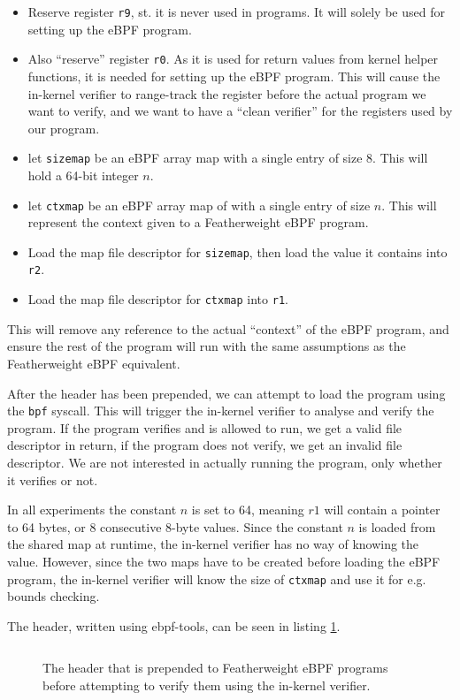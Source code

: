 \begin{itemize}
\item Reserve register \texttt{r9}, st. it is never used in programs. It will solely be used for setting up the eBPF program.
  \item Also ``reserve'' register \texttt{r0}. As it is used for return values from kernel helper functions, it is needed for setting up the eBPF program. This will cause the in-kernel verifier to range-track the register before the actual program we want to verify, and we want to have a ``clean verifier'' for the registers used by our program.
\item let \texttt{sizemap} be an eBPF array map with a single entry of size 8. This will hold a 64-bit integer $n$.
\item let \texttt{ctxmap} be an eBPF array map of with a single entry of size $n$. This will represent the context given to a Featherweight eBPF program.
\item Load the map file descriptor for \texttt{sizemap}, then load the value it contains into \texttt{r2}.
  \item Load the map file descriptor for \texttt{ctxmap} into \texttt{r1}. 
  \end{itemize}
  This will remove any reference to the actual ``context'' of the eBPF program, and ensure the rest of the program will run with the same assumptions as the Featherweight eBPF equivalent.

  
  After the header has been prepended, we can attempt to load the program using the \texttt{bpf} syscall. This will trigger the in-kernel verifier to analyse and verify the program. If the program verifies and is allowed to run, we get a valid file descriptor in return, if the program does not verify, we get an invalid file descriptor.
  We are not interested in actually running the program, only whether it verifies or not.

In all experiments the constant $n$ is set to 64, meaning $r1$ will contain a pointer to 64 bytes, or 8 consecutive 8-byte values. Since the constant $n$ is loaded from the shared map at runtime, the in-kernel verifier has no way of knowing the value. However, since the two maps have to be created before loading the eBPF program, the in-kernel verifier will know the size of \texttt{ctxmap} and use it for e.g. bounds checking. 
  
  The header, written using ebpf-tools, can be seen in listing \ref{snip:compare-header}.

  \begin{figure}[ht!]
    \centering
\inputminted[linenos]{haskell}{snippets/compare-header.hs}
    \caption{The header that is prepended to Featherweight eBPF programs before attempting to verify them using the in-kernel verifier.}
    \label{snip:compare-header}
  \end{figure}



